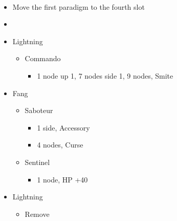 \begin{paracol}{2}
\begin{menu}
	\end{menu}
	\switchcolumn
	\
	\begin{menu}
		\begin{itemize}
			\paradigm
			\begin{itemize}
				\item Move the first paradigm to the fourth slot
				\item {}%
				      {\paradigmline{(\rav)}{\syn}{\sab}}%
				      {\paradigmline{(\rav)}{\rav}{(\sab)}}%
				      {\paradigmline{(\rav)}{(\rav)}{\sen}}%
				      {\paradigmline[4]{\textit{\rav}}{\textit{\rav}}{\textit{\com}}}%
				      {\paradigmline{[\com]}{\rav}{\com}}%
				      {\paradigmline{[\com]}{\rav}{\com}}
			\end{itemize}
			\crystarium
			\begin{itemize}
				\item Lightning
				      \begin{itemize}
					      \item Commando
					            \begin{itemize}
						            \item 1 node up 1, 7 nodes side 1, 9 nodes, Smite
					            \end{itemize}
				      \end{itemize}
				\item Fang
				      \begin{itemize}
					      \item Saboteur
					            \begin{itemize}
						            \item 1 side, Accessory
						            \item 4 nodes, Curse
					            \end{itemize}
					      \item Sentinel
					            \begin{itemize}
						            \item 1 node, HP +40
					            \end{itemize}
				      \end{itemize}
			\end{itemize}
			\equip
			\begin{itemize}
				\item Lightning
				      \begin{itemize}
					      \item Remove
					            \begin{itemize}

\end{itemize}
\end{itemize}
\end{itemize}
\end{itemize}
\end{menu}
\end{paracol}
